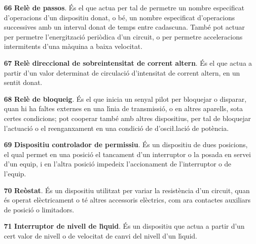 \begin{multicols}{2}
\begin{list}{}
\item[\textbf{66}]   
\textbf{Rel\`{e} de passos}. \'{E}s el que actua per tal
de permetre un nombre especificat d'operacions d'un dispositiu
donat, o b\'{e}, un nombre especificat d'operacions successives amb un
interval donat de temps entre cadascuna. Tamb\'{e} pot actuar per
permetre l'energitzaci\'{o} peri\`{o}dica d'un circuit, o per permetre acceleracions intermitents d'una
m\`{a}quina a baixa velocitat.

\item[\textbf{67}]  
\textbf{Rel\`{e} direccional de sobreintensitat de corrent altern}. \'{E}s
el que actua a partir d'un valor determinat de circulaci\'{o}
d'intensitat  de corrent altern, en un sentit donat.

\item[\textbf{68}]   
\textbf{Rel\`{e} de bloqueig}. \'{E}s el que inicia un
senyal pilot per bloquejar o disparar, quan hi ha faltes externes en
una l\'{\i}nia de transmissi\'{o}, o en altres aparells, sota certes
condicions; pot cooperar tamb\'{e} amb altres dispositius, per tal de
bloquejar l'actuaci\'{o} o el reenganxament en una condici\'{o}
de d'osci{\l.l}aci\'{o} de pot\`{e}ncia.

\item[\textbf{69}]   
\textbf{Dispositiu controlador de permissiu}. \'{E}s
un dispositiu  de dues posicions, el qual permet en una posici\'{o} el tancament d'un
interruptor o la posada en servei d'un equip, i en l'altra posici\'{o}
impedeix l'accionament de l'interruptor o de l'equip.

\item[\textbf{70}]   
\textbf{Re\`{o}stat}. \'{E}s un dispositiu utilitzat per
variar la resist\`{e}ncia d'un circuit, quan \'{e}s operat el\`{e}ctricament o t\'{e} altres accessoris el\`{e}ctrics, com ara contactes auxiliars de posici\'{o} o limitadors.

\item[\textbf{71}]   
\textbf{Interruptor de nivell de l\'{\i}quid}. \'{E}s un dispositiu que actua a partir d'un cert valor de nivell o de velocitat de canvi del nivell d'un l\'{\i}quid.


\end{list}
\end{multicols}
